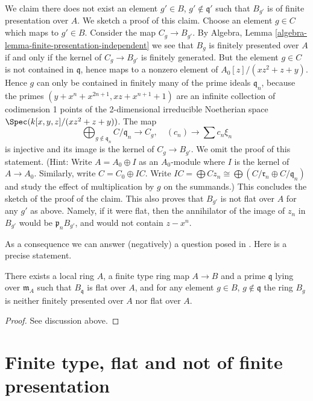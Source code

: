 \medskip\noindent
We claim there does not exist an element $g' \in B$, $g' \not \in \mathfrak q'$
such that $B_{g'}$ is of finite presentation over $A$. We sketch a proof of
this claim. Choose an element $g \in C$ which maps to $g' \in B$.
Consider the map $C_g \to B_{g'}$. By
Algebra, Lemma \ref{algebra-lemma-finite-presentation-independent}
we see that $B_g$ is finitely presented over $A$ if and only if the kernel
of $C_g \to B_{g'}$ is finitely generated. But the element $g \in C$ is
not contained in $\mathfrak q$, hence maps to a nonzero element of
$A_0[z]/(xz^2 + z + y)$. Hence $g$ can only be contained in finitely
many of the prime ideals $\mathfrak q_n$, because the primes
$(y + x^n + x^{2n + 1}, xz + x^{n + 1} + 1)$ are an infinite collection
of codimension 1 points of the 2-dimensional irreducible Noetherian space
$\Spec(k[x, y, z]/(xz^2 + z + y))$. The map
$$
\bigoplus\nolimits_{g \not \in \mathfrak q_n} C/\mathfrak q_n
\longrightarrow
C_g, \quad
(c_n) \longrightarrow \sum c_n \xi_n
$$
is injective and its image is the kernel of $C_g \to B_{g'}$. We omit the
proof of this statement. (Hint: Write $A = A_0 \oplus I$ as an $A_0$-module
where $I$ is the kernel of $A \to A_0$. Similarly, write $C = C_0 \oplus IC$.
Write
$IC = \bigoplus Cz_n \cong \bigoplus (C/\mathfrak r_n \oplus C/\mathfrak q_n)$
and study the effect of multiplication by $g$ on the summands.)
This concludes the sketch of the proof of the claim.
This also proves that $B_{g'}$ is not flat over $A$ for any $g'$ as above.
Namely, if it were flat, then the annihilator of the image of $z_n$ in
$B_{g'}$ would be $\mathfrak p_nB_{g'}$, and would not contain $z - x^n$.

\medskip\noindent
As a consequence we can answer (negatively) a question posed in
\cite[Part I, Remarques (3.4.7) ()]{GruRay}.
Here is a precise statement.

\begin{lemma}
\label{lemma-example-raynaud-gruson}
There exists a local ring $A$, a finite type ring map $A \to B$ and a prime
$\mathfrak q$ lying over $\mathfrak m_A$ such that $B_{\mathfrak q}$ is flat
over $A$, and for any element $g \in B$, $g \not \in \mathfrak q$
the ring $B_g$ is neither finitely presented over $A$ nor flat over $A$.
\end{lemma}

\begin{proof}
See discussion above.
\end{proof}


\section{Finite type, flat and not of finite presentation}
\label{section-finite-type-flat-not-finite-presentation}

